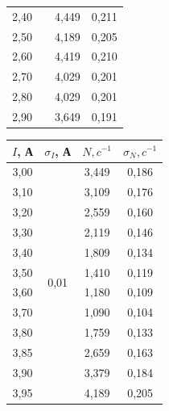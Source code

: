 \documentclass[a4paper,12pt]{report}
\begin{document}
\begin{table}[H]
\begin{tabular}{|c|c|c|c|}
2,40 &                        & 4,449        & 0,211             \\ \cline{1-1} \cline{3-4} 
2,50 &                        & 4,189        & 0,205             \\ \cline{1-1} \cline{3-4} 
2,60 &                        & 4,419        & 0,210             \\ \cline{1-1} \cline{3-4} 
2,70 &                        & 4,029        & 0,201             \\ \cline{1-1} \cline{3-4} 
2,80 &                        & 4,029        & 0,201             \\ \cline{1-1} \cline{3-4} 
2,90 &                        & 3,649        & 0,191             \\ \hline
\end{tabular}
\hspace{1cm}
\begin{tabular}{|c|c|c|c|}
\hline
$I$, А & $\sigma_{I}$, А              & $N, c^{-1}$ & $\sigma_{N},c^{-1}$ \\ \hline
3,00 & \multirow{24}{*}{0,01} & 3,449        & 0,186             \\ \cline{1-1} \cline{3-4} 
3,10 &                        & 3,109        & 0,176             \\ \cline{1-1} \cline{3-4} 
3,20 &                        & 2,559        & 0,160             \\ \cline{1-1} \cline{3-4} 
3,30 &                        & 2,119        & 0,146             \\ \cline{1-1} \cline{3-4} 
3,40 &                        & 1,809        & 0,134             \\ \cline{1-1} \cline{3-4} 
3,50 &                        & 1,410        & 0,119             \\ \cline{1-1} \cline{3-4} 
3,60 &                        & 1,180        & 0,109             \\ \cline{1-1} \cline{3-4} 
3,70 &                        & 1,090        & 0,104             \\ \cline{1-1} \cline{3-4} 
3,80 &                        & 1,759        & 0,133             \\ \cline{1-1} \cline{3-4} 
3,85 &                        & 2,659        & 0,163             \\ \cline{1-1} \cline{3-4} 
3,90 &                        & 3,379        & 0,184             \\ \cline{1-1} \cline{3-4} 
3,95 &                        & 4,189        & 0,205             \\ \cline{1-1} \cline{3-4} 

\end{tabular}
\end{table}
\end{document}
